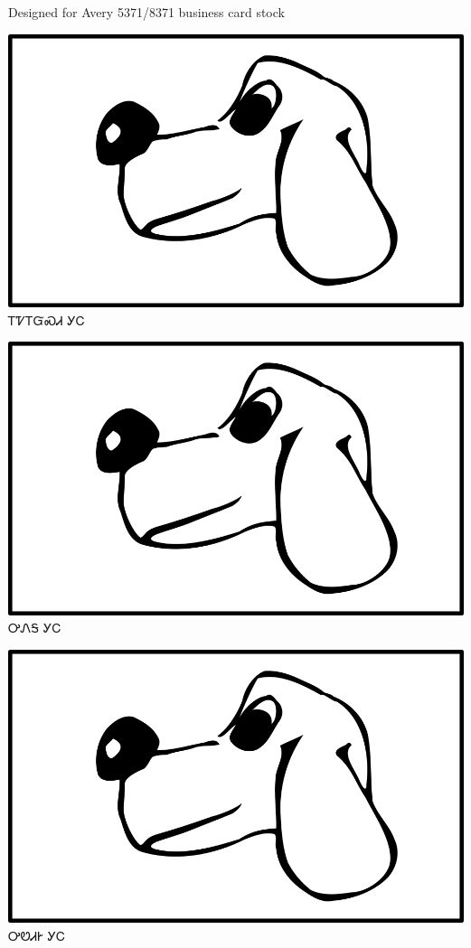 \documentclass[avery5371]{flashcards}%
\begin{document}
Designed for Avery 5371/8371 business card stock

\begin{flashcard}{
\includegraphics[width=0.95\columnwidth,height=.51\columnwidth,keepaspectratio]{../artwork/for-colors/gihli}
}
\Huge ᎢᏤᎢᏳᏍᏗ ᎩᏟ
\end{flashcard}

\begin{flashcard}{
\includegraphics[width=0.95\columnwidth,height=.51\columnwidth,keepaspectratio]{../artwork/for-colors/gihli}
}
\Huge ᎤᏁᎦ ᎩᏟ
\end{flashcard}

\begin{flashcard}{
\includegraphics[width=0.95\columnwidth,height=.51\columnwidth,keepaspectratio]{../artwork/for-colors/gihli}
}
\Huge ᎤᏬᏗᎨ ᎩᏟ
\end{flashcard}
\end{document}
